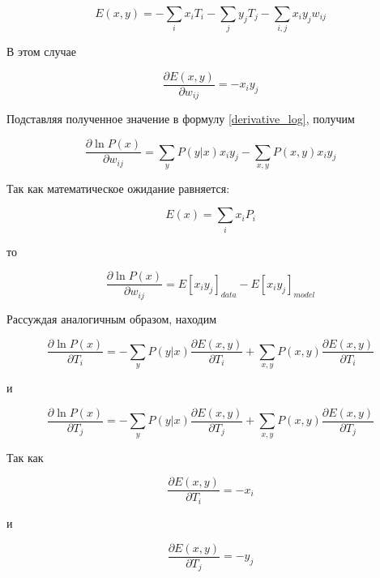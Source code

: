 \begin{equation}
	E(x,y)=-\sum_i x_iT_i-\sum_j y_jT_j-\sum_{i,j} x_iy_jw_{ij}
\end{equation}

В этом случае

\begin{equation*}
	\frac{\partial E(x,y)}{\partial w_{ij}}=-x_iy_j 	
\end{equation*}

Подставляя полученное значение в формулу \ref{derivative_log}, получим

\begin{equation}
	\label{grad_weights}
	\frac{\partial \ln P(x)}{\partial w_{ij}}=\sum_y P(y \lvert x)x_i y_j-\sum_{x,y} P(x,y)x_iy_j
\end{equation}

Так как математическое ожидание равняется:

\begin{equation}
	\label{mean}
	E(x)=\sum_i x_iP_i
\end{equation}	  

то

\begin{equation*}
	\frac{\partial \ln P(x)}{\partial w_{ij}}=E\left[x_iy_j\right]_{data}-E\left[x_iy_j\right]_{model}
\end{equation*}

Рассуждая аналогичным образом, находим

\begin{equation*}
	\frac{\partial \ln P(x)}{\partial T_{i}}=-\sum_y P(y \lvert x)\frac{\partial E(x,y)}{\partial T_{i}} + \sum_{x,y} P(x,y)\frac{\partial E(x,y)}{\partial T_{i}}
\end{equation*}

и

\begin{equation*}
	\frac{\partial \ln P(x)}{\partial T_{j}}=-\sum_y P(y \lvert x)\frac{\partial E(x,y)}{\partial T_{j}} + \sum_{x,y} P(x,y)\frac{\partial E(x,y)}{\partial T_{j}}
\end{equation*}

Так как

\begin{equation*}
	\frac{\partial E(x,y)}{\partial T_{i}}=-x_i 
\end{equation*}

и 

\begin{equation*}
	\frac{\partial E(x,y)}{\partial T_{j}}=-y_j 
\end{equation*}

